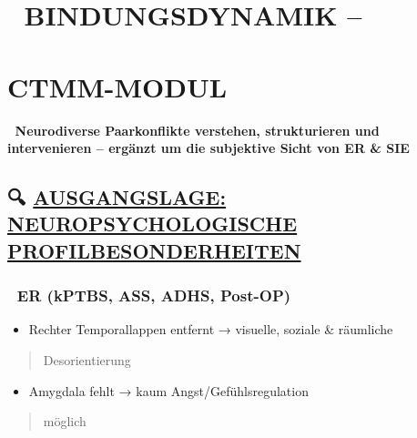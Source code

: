 %


\hypertarget{bindungsdynamik}{%
\section{\texorpdfstring{🧾 \textbf{BINDUNGSDYNAMIK --} }{🧾 BINDUNGSDYNAMIK -- }}\label{bindungsdynamik}}

\hypertarget{ctmm-modul}{%
\section{\texorpdfstring{\textbf{CTMM-MODUL}}{CTMM-MODUL}}\label{ctmm-modul}}

🧩 \textbf{Neurodiverse Paarkonflikte verstehen, strukturieren und intervenieren -- ergänzt um die subjektive Sicht von ER \& SIE}

\hypertarget{ausgangslage-neuropsychologische-profilbesonderheiten}{%
\subsection{\texorpdfstring{🔍 \textbf{\ul{AUSGANGSLAGE: NEUROPSYCHOLOGISCHE PROFILBESONDERHEITEN}}}{🔍 AUSGANGSLAGE: NEUROPSYCHOLOGISCHE PROFILBESONDERHEITEN}}\label{ausgangslage-neuropsychologische-profilbesonderheiten}}

\hypertarget{er-kptbs-ass-adhs-post-op}{%
\subsubsection{\texorpdfstring{🔵 \textbf{ER (kPTBS, ASS, ADHS, Post-OP)}}{🔵 ER (kPTBS, ASS, ADHS, Post-OP)}}\label{er-kptbs-ass-adhs-post-op}}

\begin{itemize}
\tightlist
\item
  Rechter Temporallappen entfernt → visuelle, soziale \& räumliche
\end{itemize}

\begin{quote}
Desorientierung
\end{quote}

\begin{itemize}
\tightlist
\item
  Amygdala fehlt → kaum Angst/Gefühlsregulation
\end{itemize}

\begin{quote}
möglich
\end{quote}

